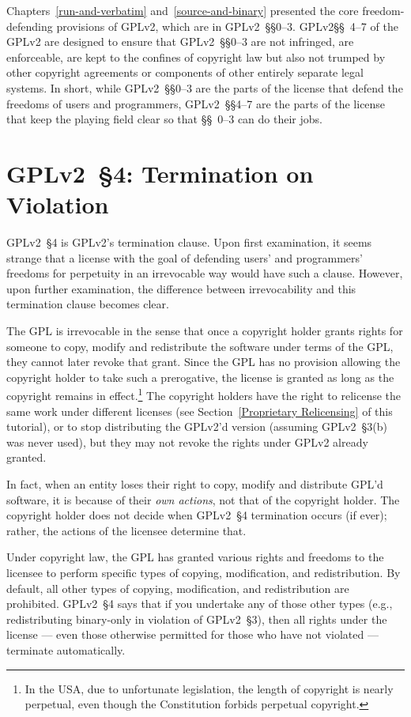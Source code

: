 Chapters~\ref{run-and-verbatim} and~\ref{source-and-binary} presented the
core freedom-defending provisions of GPLv2\@, which are in GPLv2~\S\S0--3.
GPLv2\S\S~4--7 of the GPLv2 are designed to ensure that GPLv2~\S\S0--3 are
not infringed, are enforceable, are kept to the confines of copyright law but
also not trumped by other copyright agreements or components of other
entirely separate legal systems.  In short, while GPLv2~\S\S0--3 are the parts
of the license that defend the freedoms of users and programmers,
GPLv2~\S\S4--7 are the parts of the license that keep the playing field clear
so that \S\S~0--3 can do their jobs.

\section{GPLv2~\S4: Termination on Violation}
\label{GPLv2s4}

GPLv2~\S4 is GPLv2's termination clause.  Upon first examination, it seems
strange that a license with the goal of defending users' and programmers'
freedoms for perpetuity in an irrevocable way would have such a clause.
However, upon further examination, the difference between irrevocability
and this termination clause becomes clear.

The GPL is irrevocable in the sense that once a copyright holder grants
rights for someone to copy, modify and redistribute the software under terms
of the GPL, they cannot later revoke that grant.  Since the GPL has no
provision allowing the copyright holder to take such a prerogative, the
license is granted as long as the copyright remains in effect.\footnote{In
  the USA, due to unfortunate legislation, the length of copyright is nearly
  perpetual, even though the Constitution forbids perpetual copyright.} The
copyright holders have the right to relicense the same work under different
licenses (see Section~\ref{Proprietary Relicensing} of this tutorial), or to
stop distributing the GPLv2'd version (assuming GPLv2~\S3(b) was never used),
but they may not revoke the rights under GPLv2 already granted.

In fact, when an entity loses their right to copy, modify and distribute
GPL'd software, it is because of their \emph{own actions}, not that of the
copyright holder.  The copyright holder does not decide when GPLv2~\S4
termination occurs (if ever); rather, the actions of the licensee determine
that.

Under copyright law, the GPL has granted various rights and freedoms to
the licensee to perform specific types of copying, modification, and
redistribution.  By default, all other types of copying, modification, and
redistribution are prohibited.  GPLv2~\S4 says that if you undertake any of
those other types (e.g., redistributing binary-only in violation of GPLv2~\S3),
then all rights under the license --- even those otherwise permitted for
those who have not violated --- terminate automatically.

